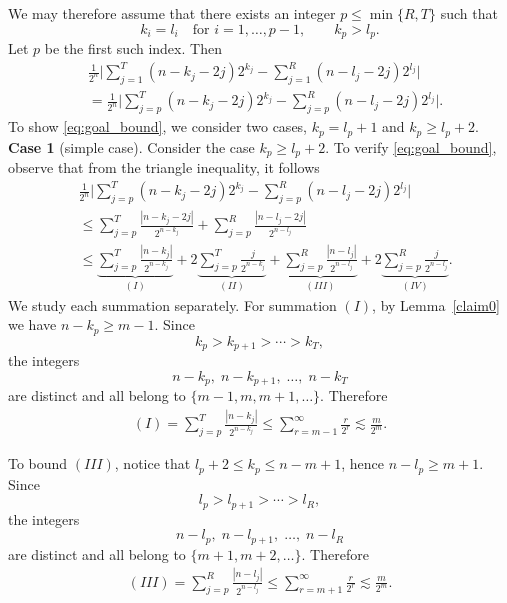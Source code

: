 \documentclass[11pt]{amsart}
\theoremstyle{definition}
\renewcommand{\1}{{\mathbbm{1}}}
\begin{document}
We may therefore assume that there exists an integer $p\le \min\{R,T\}$ such that
\[
k_i=l_i \quad \text{for } i=1,\dots,p-1,
\qquad
k_p>l_p.
\]
Let $p$ be the first such index. Then
\begin{align*}
    &\frac{1}{{2^n}}
    \Bigg|
    \sum_{j=1}^{T}(n - k_j- 2j  )2^{k_j}
    -\sum_{j=1}^{R}( n - l_j- 2j )2^{l_j}
    \Bigg|\\
    &=\frac{1}{{2^n}}
    \Bigg|
    \sum_{j=p}^{T}(n - k_j- 2j  )2^{k_j}
    -\sum_{j=p}^{R}( n - l_j- 2j )2^{l_j}
    \Bigg|.
\end{align*}
To show \eqref{eq:goal_bound}, we consider two cases, $k_p= l_p+1$ and $k_p\geq l_p+2$.\\


\textbf{Case 1} (simple case). Consider the case
$k_p\geq l_p+2$. To verify \eqref{eq:goal_bound}, observe that from the triangle inequality, it follows
\begin{equation}\label{eq:summation}
    \begin{aligned}
    &\frac{1}{{2^n}}
    \Bigg|
    \sum_{j=p}^{T}(n - k_j- 2j  )2^{k_j}
    -\sum_{j=p}^{R}( n - l_j- 2j )2^{l_j}
    \Bigg|\\
    &\leq 
    \sum_{j=p}^{T}\frac{|n - k_j- 2j  |}{2^{n-k_j}}
    +\sum_{j=p}^{R}\frac{| n - l_j- 2j |}{2^{n-l_j}}\\
    &\leq 
    \underbrace{\sum_{j=p}^{T}\frac{|n - k_j|}{2^{n-k_j}}}_{(I)}
    +2\underbrace{\sum_{j=p}^{T}\frac{j}{2^{n-k_j}}}_{(II)}
    +\underbrace{\sum_{j=p}^{R}\frac{| n - l_j |}{2^{n-l_j}}}_{(III)}
    +2\underbrace{\sum_{j=p}^{R}\frac{j}{2^{n-l_j}}}_{(IV)}.
\end{aligned}
\end{equation}
We study each summation separately. 
For summation $(I)$, by Lemma~\ref{claim0} we have $n-k_p\ge m-1$. Since
\[
k_p>k_{p+1}>\cdots >k_T,
\]
the integers
\[
n-k_p,\; n-k_{p+1},\;\dots,\; n-k_T
\]
are distinct and all belong to $\{m-1,m,m+1,\dots\}$. Therefore
\begin{align*}
(I)
= \sum_{j=p}^{T}\frac{|n-k_j|}{2^{n-k_j}}
\le \sum_{r=m-1}^{\infty}\frac{r}{2^r}
\lesssim \frac{m}{2^m}.
\end{align*}

To bound $(III)$, notice that $l_p+2\le k_p\le n-m+1$, hence
$n-l_p\ge m+1$. Since
\[
l_p>l_{p+1}>\cdots >l_R,
\]
the integers
\[
n-l_p,\; n-l_{p+1},\;\dots,\; n-l_R
\]
are distinct and all belong to $\{m+1,m+2,\dots\}$. Therefore
\begin{align*}
(III)
= \sum_{j=p}^{R}\frac{|n-l_j|}{2^{n-l_j}}
\le \sum_{r=m+1}^{\infty}\frac{r}{2^r}
\lesssim \frac{m}{2^m}.
\end{align*}
\end{document}
